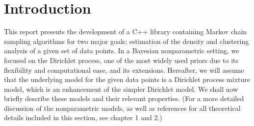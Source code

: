 \section{Introduction}
This report presents the development of a C++ library containing Markov chain sampling algorithms for two major goals: estimation of the density and clustering analysis of a given set of data points.
In a Bayesian nonparametric setting, we focused on the Dirichlet process, one of the most widely used priors due to its flexibility and computational ease, and its extensions.
Hereafter, we will assume that the underlying model for the given data points is a Dirichlet process mixture model, which is an enhancement of the simpler Dirichlet model.
We shall now briefly describe these models and their relevant properties.
(For a more detailed discussion of the nonparametric models, as well as references for all theoretical details included in this section, see \cite{book} chapter 1 and 2.)

